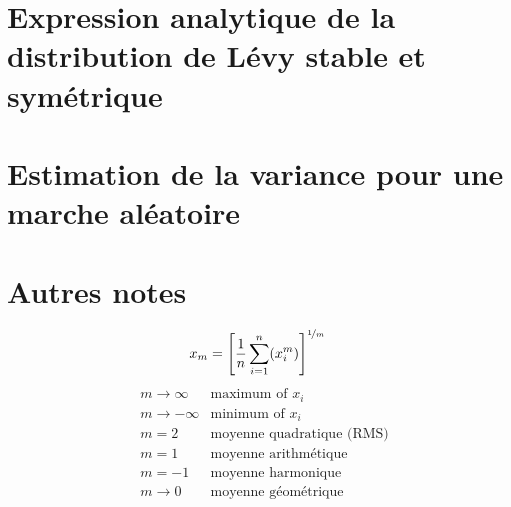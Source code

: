 \documentclass[12pt, oneside]{report}
\begin{document}
\chapter*{Expression analytique de la distribution de Lévy stable et symétrique}


\chapter*{Estimation de la variance pour une marche aléatoire}



\chapter*{Autres notes}

\begin{equation}\label{eq:moyenne_generale}
    x_{m} = \left[ \frac{1}{n} \sum_{i=1}^{n}(x_{i}^{m})\right]^{\nicefrac{1}{m}}\\
\end{equation}
\begin{align}\label{eq:parametre_m}
    & m \to \infty  & \text{maximum of } x_{i}\\
    & m \to -\infty & \text{minimum of } x_{i}\\
    & m = 2         & \text{moyenne quadratique (RMS)}\\
    & m = 1         & \text{moyenne arithmétique}\\
    & m = -1        & \text{moyenne harmonique}\\
    & m \to 0       & \text{moyenne géométrique}\\
\end{align}
\end{document}
